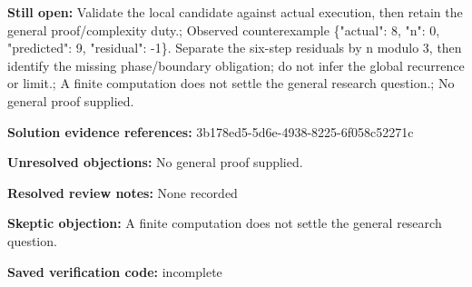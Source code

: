 \documentclass[11pt]{article}
\begin{document}
\textbf{Still open:} Validate the local candidate against actual execution, then retain the general proof/complexity duty.; Observed counterexample \{"actual": 8, "n": 0, "predicted": 9, "residual": -1\}. Separate the six-step residuals by n modulo 3, then identify the missing phase/boundary obligation; do not infer the global recurrence or limit.; A finite computation does not settle the general research question.; No general proof supplied.\par
\textbf{Solution evidence references:} 3b178ed5-5d6e-4938-8225-6f058c52271c\par
\textbf{Unresolved objections:} No general proof supplied.\par
\textbf{Resolved review notes:} None recorded\par
\textbf{Skeptic objection:} A finite computation does not settle the general research question.\par
\textbf{Saved verification code:} incomplete\par
\end{document}
